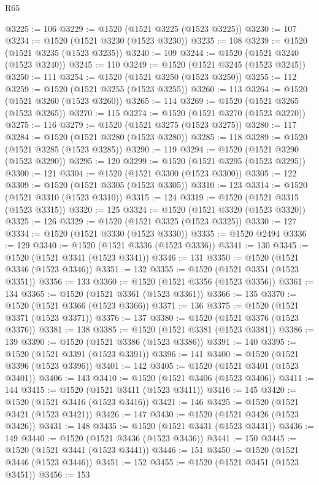 \begin{lexlean}{R65}
\begin{coremodule}
{@3225 := 106
@3229 := @1520 (@1521 @3225 (@1523 @3225))
@3230 := 107
@3234 := @1520 (@1521 @3230 (@1523 @3230))
@3235 := 108
@3239 := @1520 (@1521 @3235 (@1523 @3235))
@3240 := 109
@3244 := @1520 (@1521 @3240 (@1523 @3240))
@3245 := 110
@3249 := @1520 (@1521 @3245 (@1523 @3245))
@3250 := 111
@3254 := @1520 (@1521 @3250 (@1523 @3250))
@3255 := 112
@3259 := @1520 (@1521 @3255 (@1523 @3255))
@3260 := 113
@3264 := @1520 (@1521 @3260 (@1523 @3260))
@3265 := 114
@3269 := @1520 (@1521 @3265 (@1523 @3265))
@3270 := 115
@3274 := @1520 (@1521 @3270 (@1523 @3270))
@3275 := 116
@3279 := @1520 (@1521 @3275 (@1523 @3275))
@3280 := 117
@3284 := @1520 (@1521 @3280 (@1523 @3280))
@3285 := 118
@3289 := @1520 (@1521 @3285 (@1523 @3285))
@3290 := 119
@3294 := @1520 (@1521 @3290 (@1523 @3290))
@3295 := 120
@3299 := @1520 (@1521 @3295 (@1523 @3295))
@3300 := 121
@3304 := @1520 (@1521 @3300 (@1523 @3300))
@3305 := 122
@3309 := @1520 (@1521 @3305 (@1523 @3305))
@3310 := 123
@3314 := @1520 (@1521 @3310 (@1523 @3310))
@3315 := 124
@3319 := @1520 (@1521 @3315 (@1523 @3315))
@3320 := 125
@3324 := @1520 (@1521 @3320 (@1523 @3320))
@3325 := 126
@3329 := @1520 (@1521 @3325 (@1523 @3325))
@3330 := 127
@3334 := @1520 (@1521 @3330 (@1523 @3330))
@3335 := @1520 @2494
@3336 := 129
@3340 := @1520 (@1521 @3336 (@1523 @3336))
@3341 := 130
@3345 := @1520 (@1521 @3341 (@1523 @3341))
@3346 := 131
@3350 := @1520 (@1521 @3346 (@1523 @3346))
@3351 := 132
@3355 := @1520 (@1521 @3351 (@1523 @3351))
@3356 := 133
@3360 := @1520 (@1521 @3356 (@1523 @3356))
@3361 := 134
@3365 := @1520 (@1521 @3361 (@1523 @3361))
@3366 := 135
@3370 := @1520 (@1521 @3366 (@1523 @3366))
@3371 := 136
@3375 := @1520 (@1521 @3371 (@1523 @3371))
@3376 := 137
@3380 := @1520 (@1521 @3376 (@1523 @3376))
@3381 := 138
@3385 := @1520 (@1521 @3381 (@1523 @3381))
@3386 := 139
@3390 := @1520 (@1521 @3386 (@1523 @3386))
@3391 := 140
@3395 := @1520 (@1521 @3391 (@1523 @3391))
@3396 := 141
@3400 := @1520 (@1521 @3396 (@1523 @3396))
@3401 := 142
@3405 := @1520 (@1521 @3401 (@1523 @3401))
@3406 := 143
@3410 := @1520 (@1521 @3406 (@1523 @3406))
@3411 := 144
@3415 := @1520 (@1521 @3411 (@1523 @3411))
@3416 := 145
@3420 := @1520 (@1521 @3416 (@1523 @3416))
@3421 := 146
@3425 := @1520 (@1521 @3421 (@1523 @3421))
@3426 := 147
@3430 := @1520 (@1521 @3426 (@1523 @3426))
@3431 := 148
@3435 := @1520 (@1521 @3431 (@1523 @3431))
@3436 := 149
@3440 := @1520 (@1521 @3436 (@1523 @3436))
@3441 := 150
@3445 := @1520 (@1521 @3441 (@1523 @3441))
@3446 := 151
@3450 := @1520 (@1521 @3446 (@1523 @3446))
@3451 := 152
@3455 := @1520 (@1521 @3451 (@1523 @3451))
@3456 := 153
}
\end{coremodule}
\end{lexlean}
